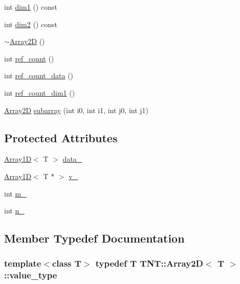 \begin{DoxyCompactItemize}
\item 
int \hyperlink{classTNT_1_1Array2D_a3997cd7973cd903cc46c0bd7abde03c0}{dim1} () const 
\item 
int \hyperlink{classTNT_1_1Array2D_a6efd5ac98f02bb42340be1d5cbf4c9c1}{dim2} () const 
\item 
\hyperlink{classTNT_1_1Array2D_a87c0133fa83755104b75631cfa4d6ab7}{$\sim$\-Array2\-D} ()
\item 
int \hyperlink{classTNT_1_1Array2D_a1669732a1a744a212c0c23b0cbafb1f1}{ref\-\_\-count} ()
\item 
int \hyperlink{classTNT_1_1Array2D_adb80c979d57de1fc4422a683703027b9}{ref\-\_\-count\-\_\-data} ()
\item 
int \hyperlink{classTNT_1_1Array2D_a8f4e8eca39d733e01642f35df5b4484b}{ref\-\_\-count\-\_\-dim1} ()
\item 
\hyperlink{classTNT_1_1Array2D}{Array2\-D} \hyperlink{classTNT_1_1Array2D_accf36569414a2570497d2a3f9fe68f52}{subarray} (int i0, int i1, int j0, int j1)
\end{DoxyCompactItemize}
\subsection*{Protected Attributes}
\begin{DoxyCompactItemize}
\item 
\hyperlink{classTNT_1_1Array1D}{Array1\-D}$<$ T $>$ \hyperlink{classTNT_1_1Array2D_afb5d79a6c51d8d27121a982aaff4bc47}{data\-\_\-}
\item 
\hyperlink{classTNT_1_1Array1D}{Array1\-D}$<$ T $\ast$ $>$ \hyperlink{classTNT_1_1Array2D_ad270c8e9b65bb9ae37fcf05797b17cbf}{v\-\_\-}
\item 
int \hyperlink{classTNT_1_1Array2D_ad866fbd5cb16df751ebf9e4eea6f2f22}{m\-\_\-}
\item 
int \hyperlink{classTNT_1_1Array2D_a4a182694802765bdb358f9737ab922b1}{n\-\_\-}
\end{DoxyCompactItemize}


\subsection{Member Typedef Documentation}
\hypertarget{classTNT_1_1Array2D_a4b8dd8e113fb40e26d44bc2f7a45cb44}{
\subsubsection[{value\-\_\-type}]{\setlength{\rightskip}{0pt plus 5cm}template$<$class T$>$ typedef T {\bf T\-N\-T\-::\-Array2\-D}$<$ T $>$\-::{\bf value\-\_\-type}}}\label{classTNT_1_1Array2D_a4b8dd8e113fb40e26d44bc2f7a45cb44}


